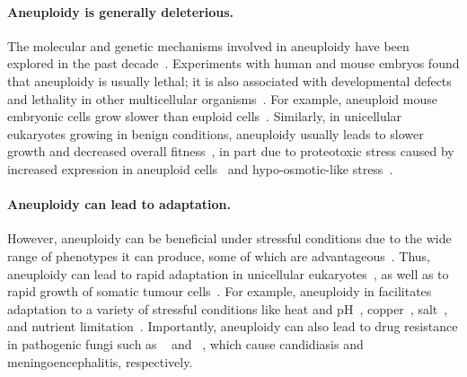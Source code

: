 \documentclass[12pt]{extarticle}
\begin{document}
\paragraph*{Aneuploidy is generally deleterious.}
The molecular and genetic mechanisms involved in aneuploidy have been explored in the past decade~\citep{Musacchio2007, Sheltzer2011, Chen2012b, Rancati2013, Gerstein2015, Shor2015}.
Experiments with human and mouse embryos found that aneuploidy is usually lethal;
it is also associated with developmental defects and lethality in other multicellular organisms~\citep{Sheltzer2011}. For example, aneuploid mouse embryonic cells grow slower than euploid cells~\citep{Williams2008}.
Similarly, in unicellular eukaryotes growing in benign conditions, aneuploidy usually leads to slower growth and decreased overall fitness~\citep{Niwa2006, Torres2007, Pavelka2010, Sheltzer2011, Kasuga2016}, in part due to proteotoxic stress caused by increased expression in aneuploid cells~\citep{Pavelka2010, Santaguida2015, Zhu2018} and hypo-osmotic-like stress~\citep{Tsai2019}.

\paragraph*{Aneuploidy can lead to adaptation.}
However, aneuploidy can be beneficial under stressful conditions due to the wide range of phenotypes it can produce, some of which are advantageous~\citep{Pavelka2010}.
Thus, aneuploidy can lead to rapid adaptation in unicellular eukaryotes~\citep{Gerstein2015,Torres2010, Hong2014, Rancati2008}, as well as to rapid growth of somatic tumour cells~\citep{Schvartzman2010, Sheltzer2017}.
For example, aneuploidy in \yeast facilitates adaptation to a variety of stressful conditions like heat and pH~\citep{Yona2012}, copper~\citep{Covo2014, Gerstein2015}, salt~\citep{Dhar2011}, and nutrient limitation~\citep{Dunham2002, Gresham2008}.
Importantly, aneuploidy can also lead to drug resistance in pathogenic fungi such as \calbicans~\citep{Selmecki2008, Selmecki2010, Gerstein2018} and \cneoformans~\citep{Sionov2010}, which cause candidiasis and meningoencephalitis, respectively.
\end{document}
